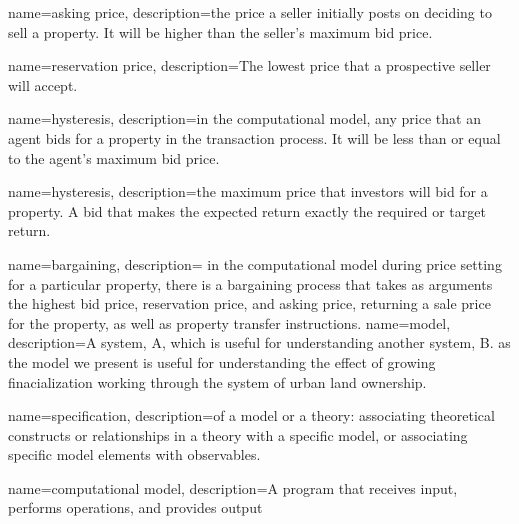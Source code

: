 


{
name=asking price,
description={the price a seller initially posts on deciding to sell a property. It will be higher than the seller's maximum bid price.}
}

{
name=reservation  price,
description={The lowest price that a prospective seller will accept.}
}

{
name=hysteresis,
description={in  the computational model, any price that an agent bids for a property in the transaction process. It will be less than or equal to the agent's maximum bid price.}
}

{
name=hysteresis,
description={the maximum price that investors will bid for a property. A bid that makes the expected return exactly the required or  target return.}
}

{
name=bargaining,
description= {in the computational model during price setting for a particular property, there is a bargaining process that takes as arguments the highest bid price, reservation price, and asking price, returning a sale price for the property, as well as property transfer instructions.}
}
{
name=model,
description={A system, A, which is useful for understanding another system, B. as the model we present is useful for understanding the effect of growing finacialization working through the system of urban land ownership. }
}

{
name=specification,
description={of a model or a theory: associating theoretical constructs or relationships in a theory with a specific model, or associating specific model elements with observables. }
}

{
name=computational model,
description={A program that receives input, performs operations, and provides output}
}

